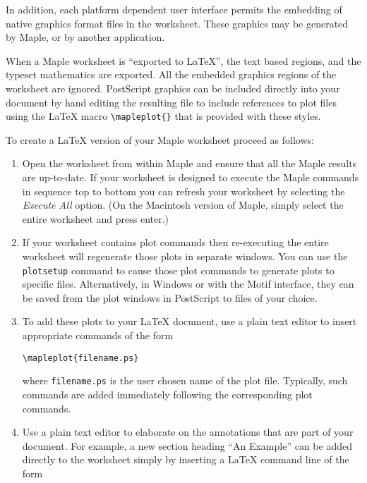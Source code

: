{In addition, each platform dependent user interface
permits the embedding of native graphics format files in the worksheet.  
These graphics may be generated by Maple, or by another application.

When a Maple worksheet is ``exported to \LaTeX{}'', the
text based regions, and the typeset mathematics are exported.
All the embedded graphics regions of the worksheet are ignored. 
PostScript graphics can be included directly into your document 
by hand editing the resulting file to include references to plot files
using the \LaTeX{} macro \verb|\mapleplot{}| that is provided
with these styles.

To create a \LaTeX{} version of your Maple worksheet proceed
as follows:

\begin{enumerate}
\item
Open the worksheet from within Maple and ensure that all
the Maple results are up-to-date.  If your worksheet is designed
to execute the Maple commands in sequence top to bottom
you can refresh your worksheet by selecting the {\em Execute
All} option.  (On the Macintosh version of Maple, simply select
the entire worksheet and press enter.)

\item
If your worksheet contains plot commands then re-executing 
the entire worksheet will regenerate those plots in 
separate windows.  You can use the {\tt plotsetup}
command to cause those plot commands to generate plots
to specific files.  Alternatively, in Windows 
or with the Motif interface, they can be saved from
the plot windows in PostScript to files of your choice.

\item
To add these plots to your \LaTeX{} document,
use a plain text editor to insert appropriate 
commands of the form

\begin{verbatim}
\mapleplot{filename.ps}
\end{verbatim}

where {\tt filename.ps} is the user chosen name of the
plot file.  Typically, such commands are added immediately
following the corresponding plot commands.

\item
Use a plain text editor to elaborate on the annotations
that are part of your document.  For example, a new section
heading ``An Example'' can be added directly to the worksheet simply
by inserting a \LaTeX{} command line of the form


\end{enumerate}}
